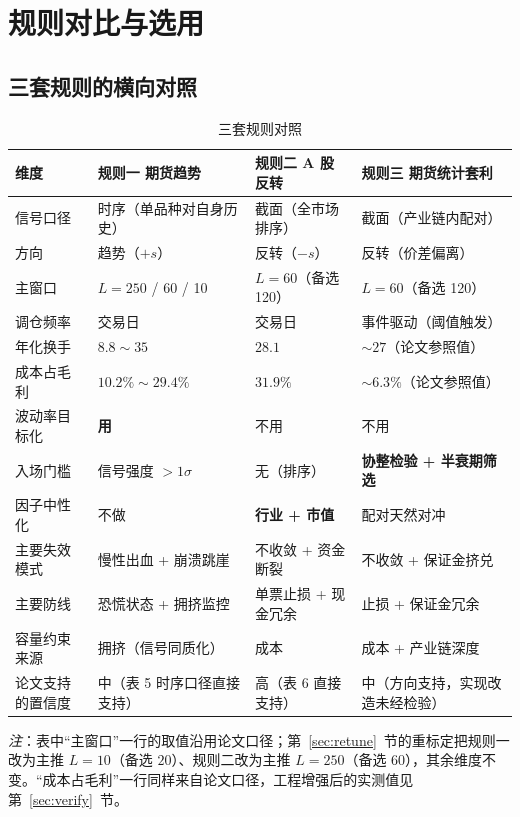 \section{规则对比与选用}\label{sec:compare}

\subsection{三套规则的横向对照}

\begin{table}[htbp]
\centering\footnotesize
\caption{三套规则对照}\label{tab:compare}
\begin{tabular}{@{}>{\raggedright\arraybackslash}p{2.9cm}>{\raggedright\arraybackslash}p{3.7cm}>{\raggedright\arraybackslash}p{3.7cm}>{\raggedright\arraybackslash}p{3.5cm}@{}}
\toprule
\textbf{维度} & \textbf{规则一 期货趋势} & \textbf{规则二 A 股反转} & \textbf{规则三 期货统计套利} \\
\midrule
信号口径 & 时序（单品种对自身历史） & 截面（全市场排序） & 截面（产业链内配对） \\
方向 & 趋势（$+s$） & 反转（$-s$） & 反转（价差偏离） \\
主窗口 & $L=250$ / 60 / 10 & $L=60$（备选 120） & $L=60$（备选 120） \\
调仓频率 & 5 交易日 & 21 交易日 & 事件驱动（阈值触发） \\
年化换手 & $8.8\sim35$ & $28.1$ & $\sim27$（论文参照值） \\
成本占毛利 & $10.2\%\sim29.4\%$ & $31.9\%$ & $\sim6.3\%$（论文参照值） \\
波动率目标化 & \textbf{用} & 不用 & 不用 \\
入场门槛 & 信号强度 $>1\sigma$ & 无（排序） & \textbf{协整检验 + 半衰期筛选} \\
因子中性化 & 不做 & \textbf{行业 + 市值} & 配对天然对冲 \\
主要失效模式 & 慢性出血 + 崩溃跳崖 & 不收敛 + 资金断裂 & 不收敛 + 保证金挤兑 \\
主要防线 & 恐慌状态 + 拥挤监控 & 单票止损 + 现金冗余 & 止损 + 保证金冗余 \\
容量约束来源 & 拥挤（信号同质化） & 成本 & 成本 + 产业链深度 \\
论文支持的置信度 & 中（表 5 时序口径直接支持） & 高（表 6 直接支持） & 中（方向支持，实现改造未经检验） \\
\bottomrule
\end{tabular}
\end{table}

\emph{注}：表中“主窗口”一行的取值沿用论文口径；第~\ref{sec:retune}~节的重标定把规则一改为主推 $L=10$（备选 $20$）、规则二改为主推 $L=250$（备选 $60$），其余维度不变。“成本占毛利”一行同样来自论文口径，工程增强后的实测值见第~\ref{sec:verify}~节。

